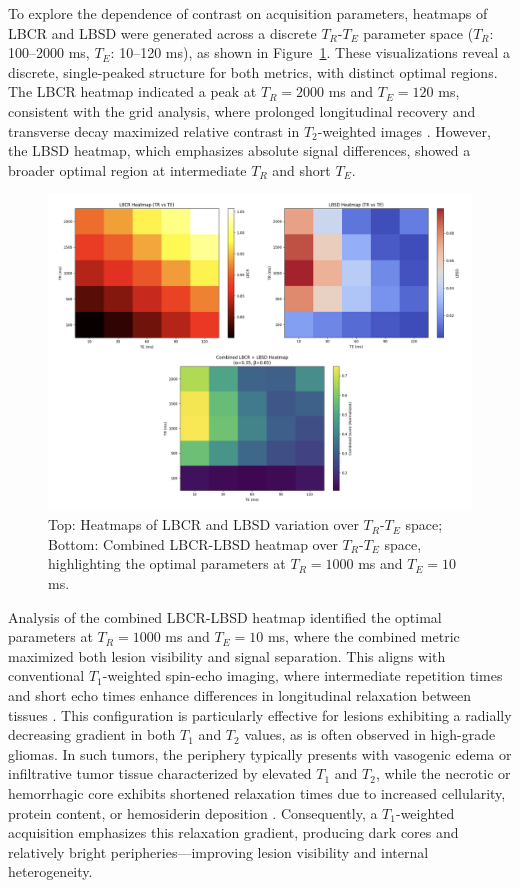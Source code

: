 \documentclass[10pt,a4paper,twoside]{article}
\begin{document}
To explore the dependence of contrast on acquisition parameters, heatmaps of LBCR and LBSD were generated across a discrete \( T_R \)-\( T_E \) parameter space (\( T_R \): 100–2000 ms, \( T_E \): 10–120 ms), as shown in Figure~\ref{fig:lbcrsurface}. These visualizations reveal a discrete, single-peaked structure for both metrics, with distinct optimal regions. The LBCR heatmap indicated a peak at \( T_R = 2000 \) ms and \( T_E = 120 \) ms, consistent with the grid analysis, where prolonged longitudinal recovery and transverse decay maximized relative contrast in \( T_2 \)-weighted images \cite{bernstein2004}. However, the LBSD heatmap, which emphasizes absolute signal differences, showed a broader optimal region at intermediate \( T_R \) and short \( T_E \).

\begin{figure}[htbp!]
\centering
\includegraphics[width=\textwidth]{figures/lbcrlbsdcombinedheatmaps.png}
\caption{Top: Heatmaps of LBCR and LBSD variation over \( T_R \)-\( T_E \) space; Bottom: Combined LBCR-LBSD heatmap over \( T_R \)-\( T_E \) space, highlighting the optimal parameters at \( T_R = 1000 \) ms and \( T_E = 10 \) ms.}
\label{fig:lbcrsurface}
\end{figure}

Analysis of the combined LBCR-LBSD heatmap identified the optimal parameters at $T_R = 1000$ ms and $T_E = 10$ ms, where the combined metric maximized both lesion visibility and signal separation. This aligns with conventional $T_1$-weighted spin-echo imaging, where intermediate repetition times and short echo times enhance differences in longitudinal relaxation between tissues \cite{skalski2013}. This configuration is particularly effective for lesions exhibiting a radially decreasing gradient in both $T_1$ and $T_2$ values, as is often observed in high-grade gliomas. In such tumors, the periphery typically presents with vasogenic edema or infiltrative tumor tissue characterized by elevated $T_1$ and $T_2$, while the necrotic or hemorrhagic core exhibits shortened relaxation times due to increased cellularity, protein content, or hemosiderin deposition \cite{englund1986,blystad2017}. Consequently, a $T_1$-weighted acquisition emphasizes this relaxation gradient, producing dark cores and relatively bright peripheries—improving lesion visibility and internal heterogeneity.
\end{document}
